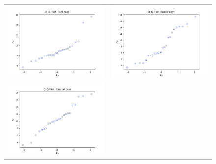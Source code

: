 \begin{enumerate}[label= (\alph*)]
    \begin{figure}[H]
        \centering
        \begin{tabular}{cc}
            \includegraphics[scale=0.30]{./python/chapter-5/Question-5-22-a-QQ-Fuel.png} &
            \includegraphics[scale=0.30]{./python/chapter-5/Question-5-22-a-QQ-Repair.png} \\
            \includegraphics[scale=0.30]{./python/chapter-5/Question-5-22-a-QQ-Capital.png}

\end{tabular}
\end{figure}
\end{enumerate}
